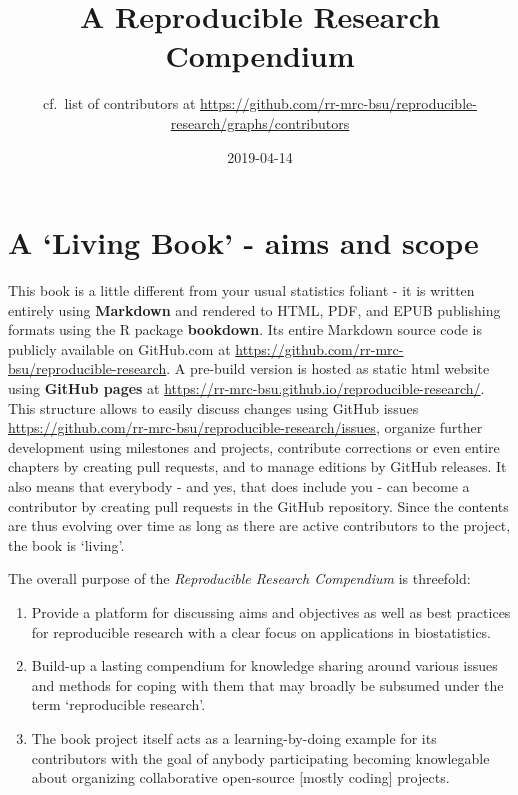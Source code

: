 \documentclass[]{book}
\title{A Reproducible Research Compendium}
\author{cf.~list of contributors at
\url{https://github.com/rr-mrc-bsu/reproducible-research/graphs/contributors}}
\date{2019-04-14}
\providecommand{\tightlist}{%
  \setlength{\itemsep}{0pt}\setlength{\parskip}{0pt}}
\begin{document}
\maketitle

{
\setcounter{tocdepth}{1}
\tableofcontents
}
\chapter{\texorpdfstring{A `Living Book' - aims and
scope}{A Living Book - aims and scope}}\label{a-living-book---aims-and-scope}

This book is a little different from your usual statistics foliant - it
is written entirely using \textbf{Markdown} and rendered to HTML, PDF,
and EPUB publishing formats using the R package \textbf{bookdown}. Its
entire Markdown source code is publicly available on GitHub.com at
\url{https://github.com/rr-mrc-bsu/reproducible-research}. A pre-build
version is hosted as static html website using \textbf{GitHub pages} at
\url{https://rr-mrc-bsu.github.io/reproducible-research/}. This
structure allows to easily discuss changes using GitHub issues
\url{https://github.com/rr-mrc-bsu/reproducible-research/issues},
organize further development using milestones and projects, contribute
corrections or even entire chapters by creating pull requests, and to
manage editions by GitHub releases. It also means that everybody - and
yes, that does include you - can become a contributor by creating pull
requests in the GitHub repository. Since the contents are thus evolving
over time as long as there are active contributors to the project, the
book is `living'.

The overall purpose of the \emph{Reproducible Research Compendium} is
threefold:

\begin{enumerate}
\def\labelenumi{\arabic{enumi}.}
\tightlist
\item
  Provide a platform for discussing aims and objectives as well as best
  practices for reproducible research with a clear focus on applications
  in biostatistics.
\item
  Build-up a lasting compendium for knowledge sharing around various
  issues and methods for coping with them that may broadly be subsumed
  under the term `reproducible research'.
\item
  The book project itself acts as a learning-by-doing example for its
  contributors with the goal of anybody participating becoming
  knowlegable about organizing collaborative open-source {[}mostly
  coding{]} projects.
\end{enumerate}
\end{document}
